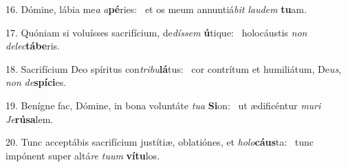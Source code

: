 16. Dómine, lábia me\textit{a} \textit{a}\textbf{pé}ries: \ast\  et os meum annuntiá\textit{bit} \textit{lau}\textit{dem} \textbf{tu}am.\

17. Quóniam si voluísses sacrifícium, de\textit{dís}\textit{sem} \textbf{ú}tique: \ast\  holocáustis \textit{non} \textit{de}\textit{lec}\textbf{tá}\textbf{be}ris.\

18. Sacrifícium Deo spíritus con\textit{tri}\textit{bu}\textbf{lá}tus: \ast\  cor contrítum et humiliátum, De\textit{us}, \textit{non} \textit{de}\textbf{spí}\textbf{ci}es.\

19. Benígne fac, Dómine, in bona voluntáte \textit{tu}\textit{a} \textbf{Si}on: \ast\  ut ædificéntur \textit{mu}\textit{ri} \textit{Je}\textbf{rú}\textbf{sa}lem.\

20. Tunc acceptábis sacrifícium justítiæ, oblatiónes, et \textit{ho}\textit{lo}\textbf{cáus}ta: \ast\  tunc impónent super altá\textit{re} \textit{tu}\textit{um} \textbf{ví}\textbf{tu}los.\

